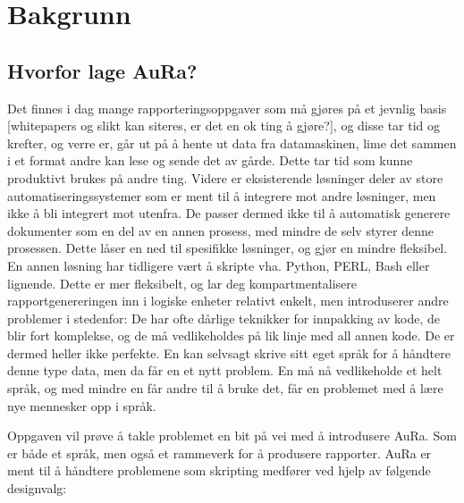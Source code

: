 \documentclass[11pt]{article}
\begin{document}



\section{Bakgrunn}



\subsection{Hvorfor lage AuRa?}
Det finnes i dag mange rapporteringsoppgaver som må gjøres på et jevnlig basis [whitepapers og slikt kan siteres, er det en ok ting å gjøre?], og disse tar tid og krefter, og verre er, går ut på å hente ut data fra datamaskinen, lime det sammen i et format andre kan lese og sende det av gårde.
Dette tar tid som kunne produktivt brukes på andre ting. Videre er eksisterende løsninger deler av store automatiseringssystemer som er ment til å integrere mot andre løsninger, men ikke å bli integrert mot utenfra. De passer dermed ikke til å automatisk generere dokumenter som en del av en annen prosess, med mindre de selv styrer denne prosessen. Dette låser en ned til spesifikke løsninger, og gjør en mindre fleksibel. En annen løsning har tidligere vært å skripte vha. Python, PERL, Bash eller lignende. Dette er mer fleksibelt, og lar deg kompartmentalisere rapportgenereringen inn i logiske enheter relativt enkelt, men introduserer andre problemer i stedenfor: De har ofte dårlige teknikker for innpakking av kode, de blir fort komplekse, og de må vedlikeholdes på lik linje med all annen kode. De er dermed heller ikke perfekte. En kan selvsagt skrive sitt eget språk for å håndtere denne type data, men da får en et nytt problem. En må nå vedlikeholde et helt språk, og med mindre en får andre til å bruke det, får en problemet med å lære nye mennesker opp i språk.



Oppgaven vil prøve å takle problemet en bit på vei med å introdusere AuRa. Som er både et språk, men også et rammeverk for å produsere rapporter. AuRa er ment til å håndtere problemene som skripting medfører ved hjelp av følgende designvalg:
\end{document}
